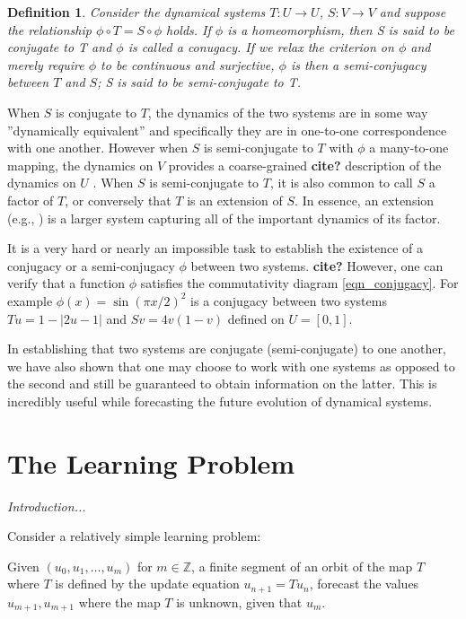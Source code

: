 \documentclass[12 pt]{article}
\newtheorem{Definition}{Definition}[]
\begin{document}
\begin{Definition}
  Consider the dynamical systems $T:U\to{U}$, $S:V\to{V}$ and suppose the relationship $\phi \circ T=S\circ \phi$ holds. If $\phi$ is a homeomorphism, then S is said to be conjugate to T and $\phi$ is called a conugacy. If we relax the criterion on $\phi$ and merely require $\phi$ to be continuous and surjective, $\phi$ is then a semi-conjugacy between $T$ and $S$; S is said to be semi-conjugate to T. 
\end{Definition}

When $S$ is conjugate to $T$, the dynamics of the two systems are in some way ''dynamically equivalent'' and specifically they are in one-to-one correspondence with one another. However when $S$ is semi-conjugate to $T$ with $\phi$ a many-to-one mapping, the dynamics on $V$ provides a coarse-grained \textbf{cite?} description of the dynamics on $U$ . When $S$ is semi-conjugate to $T$, it is also common to call $S$ a factor of $T$, or conversely that $T$ is an extension of $S$. In essence, an extension (e.g., \cite{de2013elements}) is a larger system capturing all of the important dynamics of its factor.

It is a very hard or nearly an impossible task to establish the existence of a conjugacy or a semi-conjugacy $\phi$ between two systems. \textbf{cite?} However, one can verify that a function $\phi$ satisfies the commutativity diagram \ref{eqn_conjugacy}.  For example $\phi(x)=\sin(\pi x/2)^2$ is a conjugacy between two systems $Tu=1-|2u-1|$ and $Sv=4v(1-v)$  defined on $U=[0,1]$.  

In establishing that two systems are conjugate (semi-conjugate) to one another, we have also shown that one may choose to work with one systems as opposed to the second and still be guaranteed to obtain information on the latter. This is incredibly useful while forecasting the future evolution of dynamical systems. 

\section{The Learning Problem}

\emph{Introduction...}

Consider a relatively simple learning problem: 

Given $(u_0, u_1, \ldots, u_m)$ for $m\in\mathbb{Z}$, a finite segment of an orbit of the map $T$ where $T$ is defined by the update equation $u_{n+1} = Tu_n$, forecast the values $u_{m+1}, u_{m+1}$ where the map $T$ is unknown, given that $u_m$. 
\end{document}
